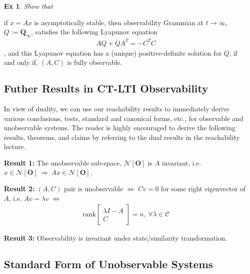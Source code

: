 \documentclass[twoside]{article}
\newtheorem{exmp}[theorem]{Ex}
\begin{document}
\begin{exmp}
Show that
\end{exmp}
if $\dot{x} = A x$ is asymptotically stable, then observability Grammian at $t \to \infty$, $Q := \mathbf{Q}_{\infty}$,
satisfies the following Lyapunov equation
%
\begin{align*}
    A Q + Q A^T = - C^T C
\end{align*}
% 
, and this Lyapunov equation has a (unique) positive-definite solution for $Q$,
if and only if, $(A,C)$ is fully observable.

\subsection{Futher Results in CT-LTI Observability}

In view of duality, we can use our reachability results to immediately derive various conclusions, tests,
standard and canonical forms, etc., for observable and unobservable systems. The reader is highly encouraged to 
derive the following results, theorems, and claims by referring to the dual results in the reachability lecture.

\textbf{Result 1:} The unobservable sub-space, $\mathcal{N} [\mathbf{O}] $ is $A$ invariant, i.e. $x\in \mathcal{N} [\mathbf{O}]  \ \Rightarrow \ A x \in \mathcal{N} [\mathbf{O}] $. 

\textbf{Result 2:} $(A,C)$ pair is unobservable $\iff$ $C v = 0$ for some right eigenvector of $A$, i.e. $A v = \lambda v$ $\iff$
\begin{align*}
\mathrm{rank} \left[ \begin{array}{c} \lambda I - A \\ \hline C \end{array} \right] = n , \ \forall \lambda \in \mathcal{C}
\end{align*}

\textbf{Result 3:} Observability is invariant under state/similarity transformation. 

\subsection{Standard Form of Unobservable Systems}
\end{document}
